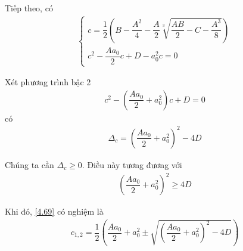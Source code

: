 \documentclass[a4paper,oneside]{book}
\numberwithin{equation}{chapter}
\begin{document}
Tiếp theo, có
\begin{align}
\left\{ {\begin{array}{*{20}{c}}
{c = \dfrac{1}{2}\left( {B - \dfrac{{{A^2}}}{4} - \dfrac{A}{2}\sqrt[3]{{\dfrac{{AB}}{2} - C - \dfrac{{{A^3}}}{8}}}} \right)}\\
{{c^2} - \dfrac{{A{a_0}}}{2}c + D - a_0^2c = 0}
\end{array}} \right.
\end{align}

Xét phương trình bậc 2
\begin{align}
\label{4.69}
{c^2} - \left( {\dfrac{{A{a_0}}}{2} + a_0^2} \right)c + D = 0
\end{align}
có 
\begin{align}
{\Delta _c} = {\left( {\dfrac{{A{a_0}}}{2} + a_0^2} \right)^2} - 4D
\end{align}

Chúng ta cần ${\Delta _c} \ge 0$. Điều này tương đương với
\begin{align}
{\left( {\dfrac{{A{a_0}}}{2} + a_0^2} \right)^2} \ge 4D
\end{align}

Khi đó, \eqref{4.69} có nghiệm là
\begin{align}
{c_{1,2}} = \dfrac{1}{2}\left( {\dfrac{{A{a_0}}}{2} + a_0^2 \pm \sqrt {{{\left( {\dfrac{{A{a_0}}}{2} + a_0^2} \right)}^2} - 4D} } \right)
\end{align}
\end{document}
